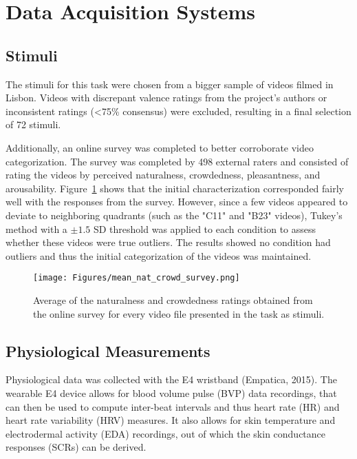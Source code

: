 \section{Data Acquisition Systems}
\label{section:data_acquisition_systems}

\subsection{Stimuli}

The stimuli for this task were chosen from a bigger sample of videos filmed in Lisbon. Videos with discrepant valence ratings from the project's authors or inconsistent ratings (<75\% consensus) were excluded, resulting in a final selection of 72 stimuli.

Additionally, an online survey was completed to better corroborate video categorization. The survey was completed by 498 external raters and consisted of rating the videos by perceived naturalness, crowdedness, pleasantness, and arousability. Figure~\ref{mean_nat_crowd_survey} shows that the initial characterization corresponded fairly well with the responses from the survey. However, since a few videos appeared to deviate to neighboring quadrants (such as the "C11" and "B23" videos), Tukey's method with a $\pm 1.5$ SD threshold was applied to each condition to assess whether these videos were true outliers. The results showed no condition had outliers and thus the initial categorization of the videos was maintained.

\begin{figure}[H]
\texttt{[image: Figures/mean\_nat\_crowd\_survey.png]}
\caption{Average of the naturalness and crowdedness ratings obtained from the online survey for every video file presented in the task as stimuli.
\label{mean_nat_crowd_survey}}
\end{figure}

\subsection{Physiological Measurements}
\label{section:physiological}

Physiological data was collected with the E4 wristband (Empatica, 2015). The wearable E4 device allows for blood volume pulse (BVP) data recordings, that can then be used to compute inter-beat intervals and thus heart rate (HR) and heart rate variability (HRV) measures. It also allows for skin temperature and electrodermal activity (EDA) recordings, out of which the skin conductance responses (SCRs) can be derived.

